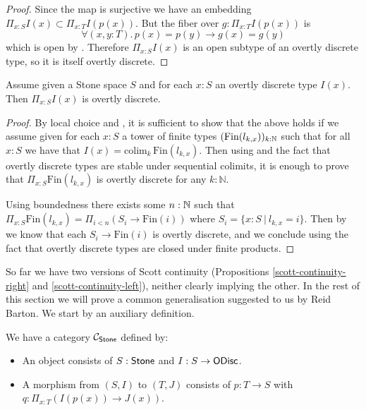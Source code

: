 \begin{proof}
Since the map is surjective we have an embedding $\Pi_{x:S}I(x)\subset \Pi_{x:T}I(p(x))$. But the fiber over $g:\Pi_{x:T}I(p(x))$ is
\[\forall (x,y:T).\, p(x)=p(y) \to g(x)=g(y)\]
which is open by . Therefore $\Pi_{x:S}I(x)$ is an open subtype of an overtly discrete type, so it is itself overtly discrete.
\end{proof}

\begin{proposition}\label{tychonov-dual-stone}
Assume given a Stone space $S$ and for each $x:S$ an overtly discrete type $I(x)$. Then $\Pi_{x:S}I(x)$ is overtly discrete.
\end{proposition}

\begin{proof}
By local choice and , it is sufficient to show that the above holds if we assume given for each $x:S$ a tower of finite types $(\mathrm{Fin}(l_{k,x}))_{k:\mathbb{N}}$
such that for all $x:S$ we have that $I(x) = \mathrm{colim}_k\, \mathrm{Fin}(l_{k,x})$.
Then using  and the fact that overtly discrete types are stable under sequential colimits, it is enough to prove that $\Pi_{x:S} \mathrm{Fin}(l_{k,x})$ is overtly discrete for any $k:\mathbb N$. 

Using boundedness there exists some $n:\mathbb{N}$ such that $\Pi_{x:S} \mathrm{Fin}(l_{k,x}) = \Pi_{i<n}(S_i\to \mathrm{Fin}(i))$ where $S_i = \{x:S\ |\ l_{k,x} = i\}$. Then by  we know that each $S_i\to \mathrm{Fin}(i)$ is overtly discrete, and we conclude using the fact that overtly discrete types are closed under finite products.
\end{proof}

So far we have two versions of Scott continuity (Propositions \ref{scott-continuity-right} and \ref{scott-continuity-left}), neither clearly implying the other. In the rest of this section we will prove a common generalisation suggested to us by Reid Barton. We start by an auxiliary definition.

\begin{definition}\label{category-scott-continuity}
We have a category ${\mathcal C}_{\mathsf{Stone}}$ defined by:

\begin{itemize}
\item An object consists of $S:\mathsf{Stone}$ and $I:S\to \mathsf{ODisc}$.
\item A morphism from $(S,I)$ to $(T,J)$ consists of $p:T\to S$ with $q:\Pi_{x:T}(I(p(x))\to J(x))$.
\end{itemize}
\end{definition}

